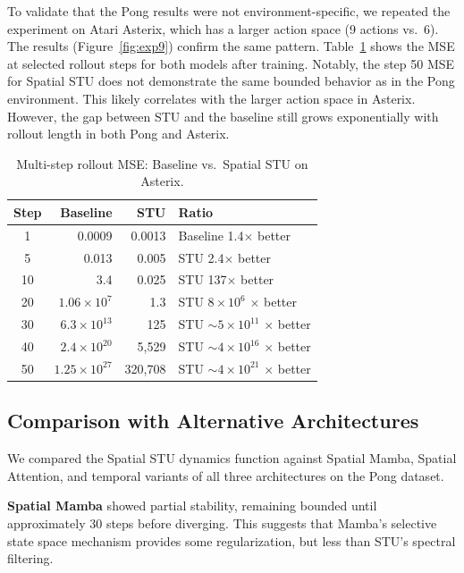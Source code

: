 \documentclass[10pt,twocolumn]{IEEEtran}
\begin{document}
To validate that the Pong results were not environment-specific, we repeated the experiment on Atari Asterix, which has a larger action space (9 actions vs.\ 6). The results (Figure~\ref{fig:exp9}) confirm the same pattern. Table~\ref{tab:asterix} shows the MSE at selected rollout steps for both models after training. Notably, the step 50 MSE for Spatial STU does not demonstrate the same bounded behavior as in the Pong environment. This likely correlates with the larger action space in Asterix. However, the gap between STU and the baseline still grows exponentially with rollout length in both Pong and Asterix.

\begin{table}[t]
\centering
\caption{Multi-step rollout MSE: Baseline vs.\ Spatial STU on Asterix.}
\label{tab:asterix}
\begin{tabular}{@{}crrl@{}}
\toprule
Step & Baseline & STU & Ratio \\
\midrule
1  & 0.0009 & 0.0013 & Baseline 1.4$\times$ better \\
5  & 0.013  & 0.005  & STU 2.4$\times$ better \\
10 & 3.4    & 0.025  & STU 137$\times$ better \\
20 & $1.06 \times 10^7$ & 1.3 & STU $8 \times 10^6$ $\times$ better \\
30 & $6.3 \times 10^{13}$ & 125 & STU ${\sim}5 \times 10^{11}$ $\times$ better \\
40 & $2.4 \times 10^{20}$ & 5,529 & STU ${\sim}4 \times 10^{16}$ $\times$ better \\
50 & $1.25 \times 10^{27}$ & 320,708 & STU ${\sim}4 \times 10^{21}$ $\times$ better \\
\bottomrule
\end{tabular}
\end{table}

\subsection{Comparison with Alternative Architectures}

We compared the Spatial STU dynamics function against Spatial Mamba, Spatial Attention, and temporal variants of all three architectures on the Pong dataset.

\textbf{Spatial Mamba} showed partial stability, remaining bounded until approximately 30 steps before diverging. This suggests that Mamba's selective state space mechanism provides some regularization, but less than STU's spectral filtering.
\end{document}
